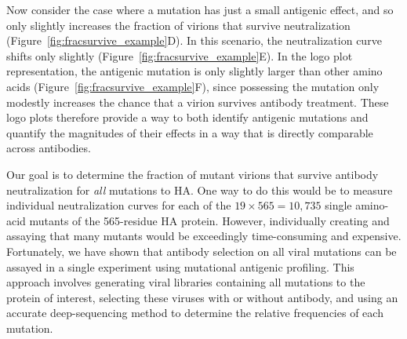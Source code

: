 \documentclass[11pt]{article}
\begin{document}
Now consider the case where a mutation has just a small antigenic effect, and so only slightly increases the fraction of virions that survive neutralization (Figure~\ref{fig:fracsurvive_example}D).
In this scenario, the neutralization curve shifts only slightly (Figure~\ref{fig:fracsurvive_example}E).
In the logo plot representation, the antigenic mutation is only slightly larger than other amino acids (Figure~\ref{fig:fracsurvive_example}F), since possessing the mutation only modestly increases the chance that a virion survives antibody treatment.
These logo plots therefore provide a way to both identify antigenic mutations and quantify the magnitudes of their effects in a way that is directly comparable across antibodies.

Our goal is to determine the fraction of mutant virions that survive antibody neutralization for \emph{all} mutations to HA.
One way to do this would be to measure individual neutralization curves for each of the $19\times565 = 10,735$ single amino-acid mutants of the 565-residue HA protein.
However, individually creating and assaying that many mutants would be exceedingly time-consuming and expensive.
Fortunately, we have shown that antibody selection on all viral mutations can be assayed in a single experiment using mutational antigenic profiling\cite{doud2017complete,dingens2017comprehensive}.
This approach involves generating viral libraries containing all mutations to the protein of interest, selecting these viruses with or without antibody, and using an accurate deep-sequencing method to determine the relative frequencies of each mutation.
\end{document}
